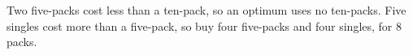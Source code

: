 Two five-packs cost less than a ten-pack, so an optimum uses no ten-packs. Five singles cost more than a five-pack, so buy four five-packs and four singles, for $\boxed8$ packs.
